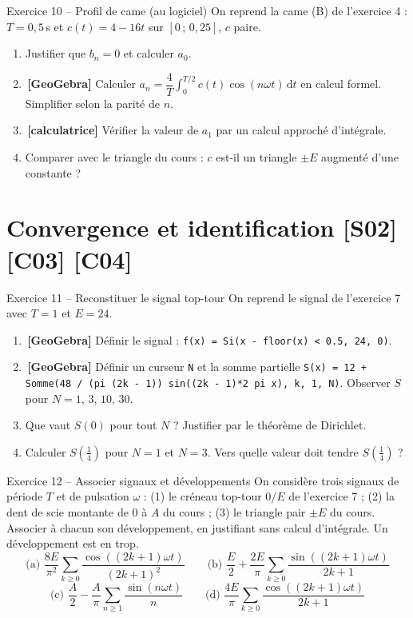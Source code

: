 \documentclass[a4paper,11pt]{article}
\newcommand{\calc}{\,{\color{uimmred}\small\textbf{[calculatrice]}}}
\newcommand{\geo}{\,{\color{uimmred}\small\textbf{[GeoGebra]}}}
\begin{document}
\begin{exo}{Exercice 10 -- Profil de came (au logiciel)}
\label{exo:10}
On reprend la came (B) de l'exercice 4 : $T = 0{,}5$\,s et $c(t) = 4 - 16t$ sur $[0\,;\,0{,}25]$, $c$ paire.
\begin{enumerate}[label=\alph*)]
  \item Justifier que $b_n = 0$ et calculer $a_0$.
  \item \geo{} Calculer $a_n = \dfrac4T\displaystyle\int_0^{T/2} c(t)\cos(n\omega t)\,\mathrm dt$ en calcul formel. Simplifier selon la parité de $n$.
  \item \calc{} Vérifier la valeur de $a_1$ par un calcul approché d'intégrale.
  \item Comparer avec le triangle du cours : $c$ est-il un triangle $\pm E$ augmenté d'une constante ?
\end{enumerate}
\end{exo}

\needspace{7cm}
\section{Convergence et identification \hfill {\normalsize\color{uimmred}[S02] [C03] [C04]}}

\begin{exo}{Exercice 11 -- Reconstituer le signal top-tour}
\label{exo:11}
On reprend le signal de l'exercice 7 avec $T = 1$ et $E = 24$.
\begin{enumerate}[label=\alph*)]
  \item \geo{} Définir le signal : \texttt{f(x) = Si(x - floor(x) < 0.5, 24, 0)}.
  \item \geo{} Définir un curseur \texttt{N} et la somme partielle \texttt{S(x) = 12 + Somme(48 / (pi (2k - 1)) sin((2k - 1)*2 pi x), k, 1, N)}. Observer $S$ pour $N = 1$, $3$, $10$, $30$.
  \item Que vaut $S(0)$ pour tout $N$ ? Justifier par le théorème de Dirichlet.
  \item Calculer $S\left(\frac14\right)$ pour $N = 1$ et $N = 3$. Vers quelle valeur doit tendre $S\left(\frac14\right)$ ?
\end{enumerate}
\end{exo}

\begin{exo}{Exercice 12 -- Associer signaux et développements}
\label{exo:12}
On considère trois signaux de période $T$ et de pulsation $\omega$ : (1) le créneau top-tour $0/E$ de l'exercice 7 ; (2) la dent de scie montante de $0$ à $A$ du cours ; (3) le triangle pair $\pm E$ du cours. Associer à chacun son développement, en justifiant sans calcul d'intégrale. Un développement est en trop.
\[
\text{(a) } \frac{8E}{\pi^2}\sum_{k\geq 0}\frac{\cos((2k+1)\omega t)}{(2k+1)^2}
\qquad
\text{(b) } \frac E2 + \frac{2E}{\pi}\sum_{k\geq 0}\frac{\sin((2k+1)\omega t)}{2k+1}
\]
\[
\text{(c) } \frac A2 - \frac A\pi\sum_{n\geq 1}\frac{\sin(n\omega t)}{n}
\qquad
\text{(d) } \frac{4E}{\pi}\sum_{k\geq 0}\frac{\cos((2k+1)\omega t)}{2k+1}
\]
\end{exo}
\end{document}
